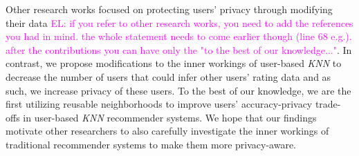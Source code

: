 \documentclass[manuscript,review,anonymous]{acmart}
\newcommand{\el}[1]{
        \textcolor{magenta}{EL: #1}}
\begin{document}
Other research works focused on protecting users' privacy through modifying their data \el{if you refer to other research works, you need to add the references you had in mind. the whole statement needs to come earlier though (line 68 e.g.). after the contributions you can have only the "to the best of our knowledge..."}.
In contrast, we propose modifications to the inner workings 
of user-based \emph{KNN} to decrease the number of users that could infer other users' rating data and as such, we increase privacy of these users.
To the best of our knowledge, we are the first utilizing reusable neighborhoods to improve users' accuracy-privacy trade-offs in user-based \emph{KNN} recommender systems.
We hope that our findings motivate other researchers to also carefully investigate the inner workings of traditional recommender systems to make them more privacy-aware.


\end{document}
